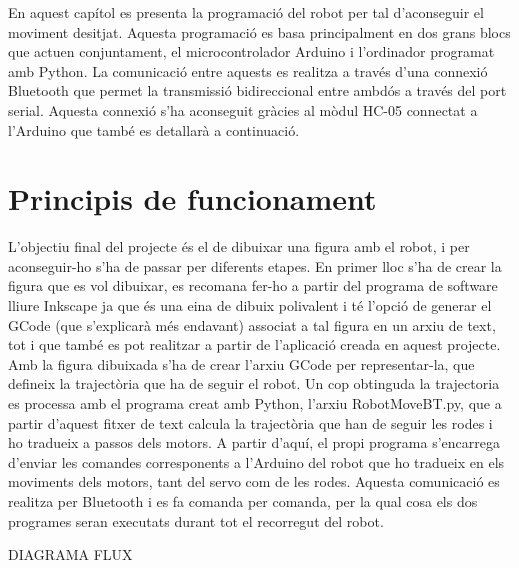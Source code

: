 






En aquest capítol es presenta la programació del robot per tal d’aconseguir el moviment desitjat. Aquesta programació es basa principalment en dos grans blocs que actuen conjuntament, el microcontrolador Arduino i l’ordinador programat amb Python. La comunicació entre aquests es realitza a través d’una connexió Bluetooth que permet la transmissió bidireccional entre ambdós a través del port serial. Aquesta connexió s’ha aconseguit gràcies al mòdul HC-05 connectat a l’Arduino que també es detallarà a continuació.


\section{Principis de funcionament}

L’objectiu final del projecte és el de dibuixar una figura amb el robot, i per aconseguir-ho s’ha de passar per diferents etapes. En primer lloc s’ha de crear la figura que es vol dibuixar, es recomana fer-ho a partir del programa de software lliure Inkscape ja que és una eina de dibuix polivalent i té l’opció de generar el GCode (que s’explicarà més endavant) associat a tal figura en un arxiu de text, tot i que també es pot realitzar a partir de l’aplicació creada en aquest projecte. Amb la figura dibuixada s’ha de crear l’arxiu GCode per representar-la, que defineix la trajectòria que ha de seguir el robot. Un cop obtinguda la trajectoria es processa amb el programa creat amb Python, l’arxiu RobotMoveBT.py, que a partir d’aquest fitxer de text calcula la trajectòria que han de seguir les rodes i ho tradueix a passos dels motors. A partir d’aquí, el propi programa s’encarrega d’enviar les comandes corresponents a l’Arduino del robot que ho tradueix en els moviments dels motors, tant del servo com de les rodes. Aquesta comunicació es realitza per Bluetooth i es fa comanda per comanda, per la qual cosa els dos programes seran  executats durant tot el recorregut del robot.   

DIAGRAMA FLUX




